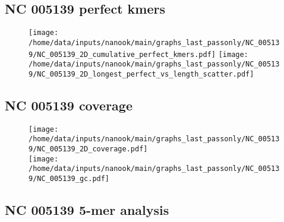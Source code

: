 \documentclass[a4paper,11pt,oneside]{article}
\begin{document}
\subsection*{NC 005139 perfect kmers}
\vspace{-3mm}
\begin{figure}[H]
\centering
  \texttt{[image: /home/data/inputs/nanook/main/graphs\_last\_passonly/NC\_005139/NC\_005139\_2D\_cumulative\_perfect\_kmers.pdf]}
     \texttt{[image: /home/data/inputs/nanook/main/graphs\_last\_passonly/NC\_005139/NC\_005139\_2D\_longest\_perfect\_vs\_length\_scatter.pdf]}
\end{figure}
\subsection*{NC 005139 coverage}
\vspace{-3mm}
\begin{figure}[H]
\centering
  \texttt{[image: /home/data/inputs/nanook/main/graphs\_last\_passonly/NC\_005139/NC\_005139\_2D\_coverage.pdf]} \\
\texttt{[image: /home/data/inputs/nanook/main/graphs\_last\_passonly/NC\_005139/NC\_005139\_gc.pdf]}
\end{figure}
\subsection*{NC 005139 5-mer analysis}
\end{document}
